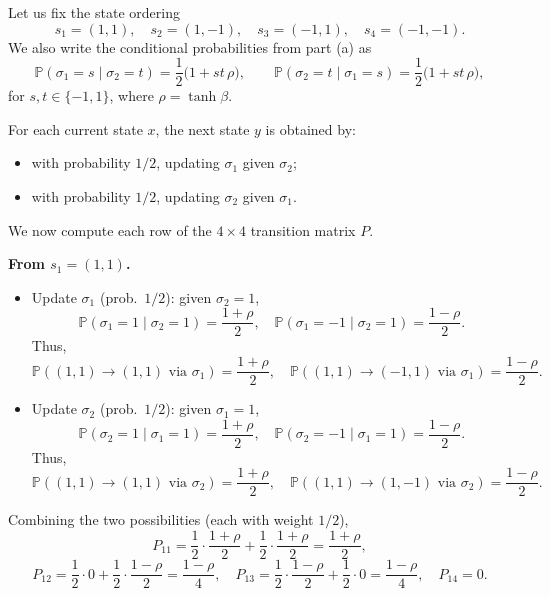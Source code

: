 \documentclass[answers,12pt,addpoints]{exam}
\begin{document}
\begin{enumerate}
\begin{solution}
Let us fix the state ordering
\[
s_1 = (1,1),\quad s_2 = (1,-1),\quad s_3 = (-1,1),\quad s_4 = (-1,-1).
\]
We also write the conditional probabilities from part (a) as
\[
\mathbb{P}(\sigma_1 = s \mid \sigma_2 = t)
= \frac{1}{2}\bigl(1 + s t\, \rho\bigr),\qquad
\mathbb{P}(\sigma_2 = t \mid \sigma_1 = s)
= \frac{1}{2}\bigl(1 + s t\, \rho\bigr),
\]
for $s,t \in \{-1,1\}$, where $\rho = \tanh \beta$.

For each current state $x$, the next state $y$ is obtained by:
\begin{itemize}
    \item with probability $1/2$, updating $\sigma_1$ given $\sigma_2$;
    \item with probability $1/2$, updating $\sigma_2$ given $\sigma_1$.
\end{itemize}
We now compute each row of the $4\times 4$ transition matrix $P$.

\medskip
\noindent\textbf{From $s_1=(1,1)$.}
\begin{itemize}
    \item Update $\sigma_1$ (prob.\ $1/2$): given $\sigma_2=1$,
    \[
    \mathbb{P}(\sigma_1=1\mid\sigma_2=1)=\frac{1+\rho}{2},\quad
    \mathbb{P}(\sigma_1=-1\mid\sigma_2=1)=\frac{1-\rho}{2}.
    \]
    Thus,
    \[
    \mathbb{P}((1,1)\to(1,1) \text{ via }\sigma_1) = \frac{1+\rho}{2},\quad
    \mathbb{P}((1,1)\to(-1,1) \text{ via }\sigma_1) = \frac{1-\rho}{2}.
    \]
    \item Update $\sigma_2$ (prob.\ $1/2$): given $\sigma_1=1$,
    \[
    \mathbb{P}(\sigma_2=1\mid\sigma_1=1)=\frac{1+\rho}{2},\quad
    \mathbb{P}(\sigma_2=-1\mid\sigma_1=1)=\frac{1-\rho}{2}.
    \]
    Thus,
    \[
    \mathbb{P}((1,1)\to(1,1) \text{ via }\sigma_2) = \frac{1+\rho}{2},\quad
    \mathbb{P}((1,1)\to(1,-1) \text{ via }\sigma_2) = \frac{1-\rho}{2}.
    \]
\end{itemize}
Combining the two possibilities (each with weight $1/2$),
\[
P_{11} = \frac{1}{2}\cdot\frac{1+\rho}{2} + \frac{1}{2}\cdot\frac{1+\rho}{2}
= \frac{1+\rho}{2},
\]
\[
P_{12} = \frac{1}{2}\cdot 0 + \frac{1}{2}\cdot\frac{1-\rho}{2}
= \frac{1-\rho}{4},
\quad
P_{13} = \frac{1}{2}\cdot\frac{1-\rho}{2} + \frac{1}{2}\cdot 0
= \frac{1-\rho}{4},
\quad
P_{14} = 0.
\]


\end{solution}
\end{enumerate}
\end{document}
